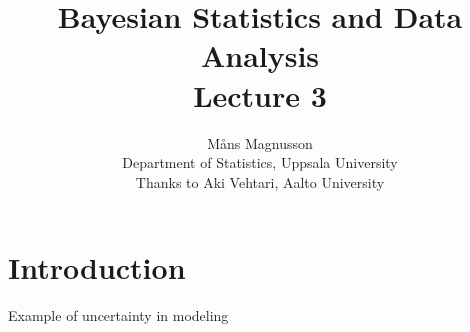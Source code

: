 \documentclass[10pt,handout]{beamer}
\title[]{{\color{black}Bayesian Statistics and Data Analysis \\ Lecture 3}}
\author[]{M{\aa}ns Magnusson \\ Department of Statistics, Uppsala University \\ Thanks to Aki Vehtari, Aalto University}
\date{}
\begin{document}
\frame{\titlepage
}



\section{Introduction}
\frame{\sectionpage}

\begin{frame}

  {Example of uncertainty in modeling}



\end{frame}
\end{document}
